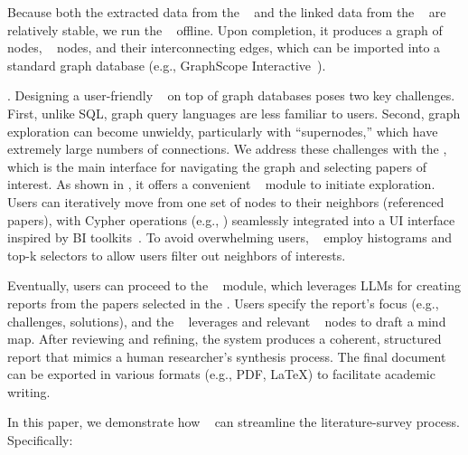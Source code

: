 Because both the extracted data from the \inspector~ and the linked data from the \navigator~ are relatively stable, we run the \scrapper~ offline. Upon completion, it produces a graph of \fact~ nodes, \dimension~ nodes, and their interconnecting edges, which can be imported into a standard graph database (e.g., GraphScope Interactive~\cite{graphscope}).

.
Designing a user-friendly \surveyor~ on top of graph databases poses two key challenges. First, unlike SQL, graph query languages are less familiar to users. Second, graph exploration can become unwieldy, particularly with “supernodes,” which have extremely large numbers of connections.  We address these challenges with the \explorer, which is the main interface for navigating the graph and selecting papers of interest. As shown in , it offers a convenient \search~ module to initiate exploration. Users can iteratively move from one set of nodes to their neighbors (referenced papers), with Cypher operations (e.g., \neighborquery) seamlessly integrated into a UI interface inspired by BI toolkits~\cite{polaris}. To avoid overwhelming users, \explorer~ employ histograms and top-k selectors to allow users filter out neighbors of interests.

Eventually, users can proceed to the \generator~ module, which leverages LLMs for creating reports from the papers selected in the \explorer. Users specify the report’s focus (e.g., challenges, solutions), and the \generator~ leverages \fact and relevant \dimension~ nodes to draft a mind map. After reviewing and refining, the system produces a coherent, structured report that mimics a human researcher’s synthesis process. The final document can be exported in various formats (e.g., PDF, LaTeX) to facilitate academic writing.


In this paper, we demonstrate how \sys~ can streamline the literature-survey process. Specifically:

